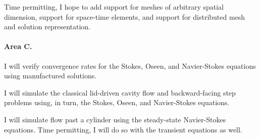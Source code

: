 \documentclass[12pt,c]{article}
\begin{document}
Time permitting, I hope to add support for meshes of arbitrary spatial dimension, support for space-time elements, and support for distributed mesh and solution representation.

\paragraph{Area C.} I will verify convergence rates for the Stokes, Oseen, and Navier-Stokes equations using manufactured solutions.

I will simulate the classical lid-driven cavity flow and backward-facing step problems using, in turn, the Stokes, Oseen, and Navier-Stokes equations.

I will simulate flow past a cylinder using the steady-state Navier-Stokes equations.  Time permitting, I will do so with the transient equations as well.

\nocite{Chorin68}
\nocite{Rannacher99}



\end{document}
